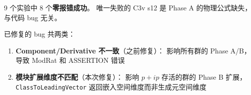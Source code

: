 \documentclass[a4paper,fontset=ubuntu,12pt]{ctexart}
\begin{document}
9 个实验中 8 个\textbf{零报错成功}。
唯一失败的 C3v s12 是 Phase A 的物理公式缺失，与代码 bug 无关。

已修复的 bug 共两类：
\begin{enumerate}
\item \textbf{Component/Derivative 不一致}（之前修复）：
      影响所有群的 Phase A/B，导致 ModRat 和 ASSERTION 错误
\item \textbf{模块扩展维度不匹配}（本次修复）：
      影响 $p{+}ip$ 存活的群的 Phase B 扩展，
      \texttt{ClassToLeadingVector} 返回嵌入空间维度而非生成元空间维度
\end{enumerate}
\end{document}
